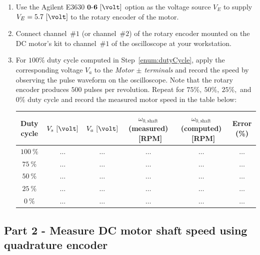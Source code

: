 \begin{enumerate}
\item Use the Agilent E3630 $\mathbf{0}$-$\mathbf{6}~[\volt]$ option  as the voltage source $V_E$ to supply $V_E = 5.7~[\volt]$ to the rotary encoder of the motor.
\item Connect channel~$\#1$ (or channel~$\#2$) of the rotary encoder mounted on the DC motor's kit to channel~$\#1$ of the oscilloscope at your workstation.   
\item For $100\%$ duty cycle computed in Step~\ref{enum:dutyCycle}, apply the corresponding voltage $V_a$ to the \emph{Motor $\pm$ terminals} and record the speed by observing the pulse waveform on the oscilloscope. Note that the rotary encoder produces $500$ pulses per revolution. Repeat for $75\%,~50\%,~25\%,$ and $0\%$ duty cycle and record the measured motor speed in the table below: %
%
%
  \begin{center}
    \begin{tabular}{c|c|c|c|c|c}
      \toprule
      Duty cycle &  $V_s~[\volt]$ & $V_a~[\volt]$&$\omega_{0,\mathrm{shaft}}$ (measured) ~[RPM]&  $\omega_{0,\mathrm{shaft}}$ (computed) ~[RPM] & Error (\%)\\
      \toprule
      $100~\%$ & $\ldots$ & $\ldots$& $\ldots$ & $\ldots$ & $\ldots$\\   %
      $75~\%$ & $\ldots$ & $\ldots$& $\ldots$ & $\ldots$ & $\ldots$\\   %
      $50~\%$ & $\ldots$ & $\ldots$& $\ldots$ & $\ldots$ & $\ldots$\\   %
      $25~\%$ & $\ldots$ & $\ldots$& $\ldots$ & $\ldots$ & $\ldots$\\   %
      $0~\%$ & $\ldots$ & $\ldots$& $\ldots$ & $\ldots$ & $\ldots$\\   %
      \bottomrule
    \end{tabular}    
  \end{center}
  
\end{enumerate}

\subsection{Part 2 - Measure DC motor shaft speed using quadrature encoder}


